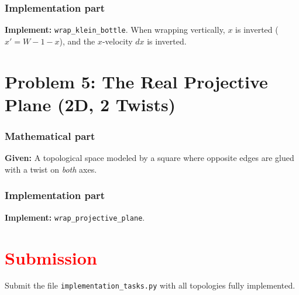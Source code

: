 \documentclass[11pt]{article}
\begin{document}
\subsubsection*{Implementation part}
\textbf{Implement:} \lstinline|wrap_klein_bottle|. When wrapping vertically, $x$ is inverted ($x' = W - 1 - x$), and the $x$-velocity $dx$ is inverted.


\section*{Problem 5: The Real Projective Plane (2D, 2 Twists)}

\subsubsection*{Mathematical part}
\textbf{Given:} A topological space modeled by a square where opposite edges are glued with a twist on \textit{both} axes.
\begin{center}
\end{center}

\subsubsection*{Implementation part}
\textbf{Implement:} \lstinline|wrap_projective_plane|. 

\section*{\textcolor{red}{Submission}}

Submit the file \texttt{implementation\_tasks.py} with all topologies fully implemented.
\end{document}
